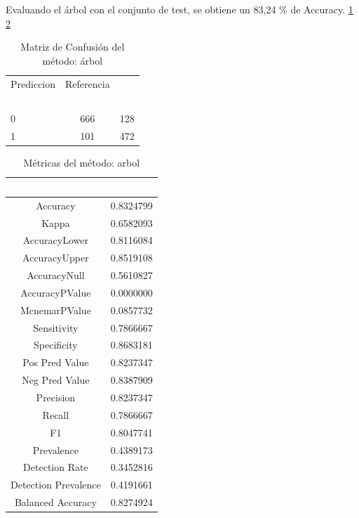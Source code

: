 Evaluando el árbol con el conjunto de test, se obtiene un 83,24 \% de Accuracy. \ref{tab:MatrizConf_arbol} \ref{tab:metricas_arbol}

\begin{table}[!h]
	
	\caption{\label{tab:MatrizConf_arbol}Matriz de Confusión del método: árbol }
	\centering
	\begin{tabular}[t]{lcc}
		\toprule
		\multicolumn{1}{c}{Prediccion} & \multicolumn{1}{c}{Referencia} & \multicolumn{1}{c}{ } \\
		\cmidrule(l{3pt}r{3pt}){1-1} \cmidrule(l{3pt}r{3pt}){2-2}
		\rowcolor{black}  \multicolumn{1}{c}{\textcolor{white}{\textbf{ }}} & \multicolumn{1}{c}{\textcolor{white}{\textbf{0}}} & \multicolumn{1}{c}{\textcolor{white}{\textbf{1}}}\\
		\midrule
		\rowcolor{gray!6}  0 & 666 & 128\\
		1 & 101 & 472\\
		\bottomrule
	\end{tabular}
\end{table}

\begin{table}[!h]
	
	\caption{\label{tab:metricas_arbol}Métricas del método: arbol }
	\centering
	\begin{tabular}[t]{cc}
		\toprule
		\rowcolor{black}  \multicolumn{1}{c}{\textcolor{white}{\textbf{metricas}}} & \multicolumn{1}{c}{\textcolor{white}{\textbf{valor}}}\\
		\midrule
		\rowcolor{gray!6}  Accuracy & 0.8324799\\
		Kappa & 0.6582093\\
		\rowcolor{gray!6}  AccuracyLower & 0.8116084\\
		AccuracyUpper & 0.8519108\\
		\rowcolor{gray!6}  AccuracyNull & 0.5610827\\
		\addlinespace
		AccuracyPValue & 0.0000000\\
		\rowcolor{gray!6}  McnemarPValue & 0.0857732\\
		Sensitivity & 0.7866667\\
		\rowcolor{gray!6}  Specificity & 0.8683181\\
		Pos Pred Value & 0.8237347\\
		\addlinespace
		\rowcolor{gray!6}  Neg Pred Value & 0.8387909\\
		Precision & 0.8237347\\
		\rowcolor{gray!6}  Recall & 0.7866667\\
		F1 & 0.8047741\\
		\rowcolor{gray!6}  Prevalence & 0.4389173\\
		\addlinespace
		Detection Rate & 0.3452816\\
		\rowcolor{gray!6}  Detection Prevalence & 0.4191661\\
		Balanced Accuracy & 0.8274924\\
		\bottomrule
	\end{tabular}
\end{table}


